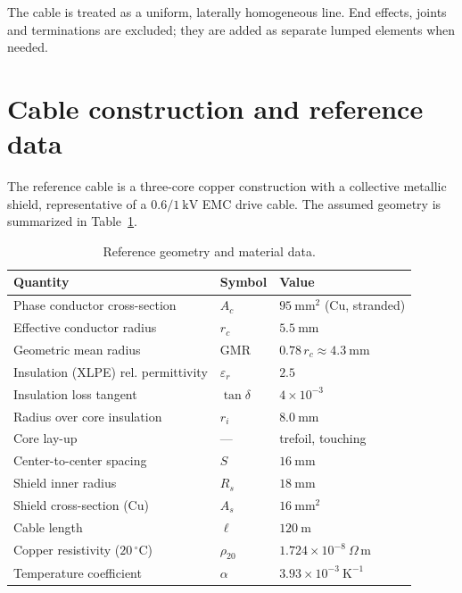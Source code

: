 \documentclass[11pt,a4paper,oneside]{book}
\begin{document}
\begin{onehalfspace}
\begin{appendices}
The cable is treated as a uniform, laterally homogeneous line. End effects,
joints and terminations are excluded; they are added as separate lumped elements
when needed.

\section{Cable construction and reference data}
The reference cable is a three-core copper construction with a collective metallic
shield, representative of a $0.6/1\ \mathrm{kV}$ EMC drive cable. The assumed
geometry is summarized in Table~\ref{tab:geom}. 

\begin{table}[h]
	\centering
	\caption{Reference geometry and material data.}
	\label{tab:geom}
	\begin{tabular}{@{}lll@{}}
		\toprule
		Quantity & Symbol & Value \\
		\midrule
		Phase conductor cross-section & $A_c$ & $95\ \mathrm{mm^2}$ (Cu, stranded) \\
		Effective conductor radius & $r_c$ & $5.5\ \mathrm{mm}$ \\
		Geometric mean radius & $\mathrm{GMR}$ & $0.78\,r_c \approx 4.3\ \mathrm{mm}$ \\
		Insulation (XLPE) rel. permittivity & $\varepsilon_r$ & $2.5$ \\
		Insulation loss tangent & $\tan\delta$ & $4\times10^{-3}$ \\
		Radius over core insulation & $r_i$ & $8.0\ \mathrm{mm}$ \\
		Core lay-up & --- & trefoil, touching \\
		Center-to-center spacing & $S$ & $16\ \mathrm{mm}$ \\
		Shield inner radius & $R_s$ & $18\ \mathrm{mm}$ \\
		Shield cross-section (Cu) & $A_s$ & $16\ \mathrm{mm^2}$ \\
		Cable length & $\ell$ & $120\ \mathrm{m}$ \\
		Copper resistivity ($20\,^\circ\mathrm{C}$) & $\rho_{20}$ & $1.724\times10^{-8}\ \Omega\,\mathrm{m}$ \\
		Temperature coefficient & $\alpha$ & $3.93\times10^{-3}\ \mathrm{K^{-1}}$ \\
		\bottomrule
	\end{tabular}
\end{table}

\end{appendices}
\end{onehalfspace}
\end{document}
